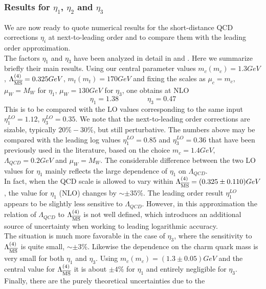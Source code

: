 \subsubsection{Results for $\eta_1$, $\eta_2$ and $\eta_3$}
\label{sec:HeffKKbar:Num:Res}
We are now ready to quote numerical results for the
short-distance QCD corrections $\eta_i$ at next-to-leading order
and to compare them with the leading order approximation.
\\
The factors $\eta_1$ and $\eta_3$ have been analyzed in detail in
\cite{herrlichnierste:93} and \cite{nierste:95}.
Here we summarize briefly their main results.
Using our central parameter values $m_c(m_c)=1.3 GeV$,
$\Lambda_{\overline{\rm MS}}^{(4)}=0.325 GeV$, $m_t(m_t)=170 GeV$ and
fixing the scales as $\mu_c=m_c$, $\mu_W=M_W$ for $\eta_1$,
$\mu_W=130 GeV$ for $\eta_3$, one obtains at NLO
\begin{equation}\label{eta13nlo}
\eta_1=1.38\qquad\qquad \eta_3=0.47
\end{equation}
This is to be compared with the LO values corresponding to the same
input $\eta^{LO}_1=1.12$, $\eta^{LO}_3=0.35$.  We note that the
next-to-leading order corrections are sizable, typically $20\%-30\%$,
but still perturbative.  The numbers above may be compared with the
leading log values $\eta^{LO}_1=0.85$ and $\eta^{LO}_3=0.36$ that have
been previously used in the literature, based on the choice $m_c=1.4
GeV$, $\Lambda_{QCD}=0.2 GeV$ and $\mu_W=M_W$.  The considerable
difference between the two LO values for $\eta_1$ mainly reflects the
large dependence of $\eta_1$ on $\Lambda_{QCD}$.
\\
In fact, when the QCD scale is allowed to vary within
$\Lambda_{\overline{\rm MS}}^{(4)}=(0.325\pm 0.110)GeV$, the
value for $\eta_1$ (NLO) changes by $\sim\pm 35\%$. The leading order
result $\eta^{LO}_1$ appears to be slightly less sensitive to
$\Lambda_{QCD}$. However, in this approximation the relation of
$\Lambda_{QCD}$ to $\Lambda_{\overline{\rm MS}}^{(4)}$ is not well
defined, which introduces an additional source of uncertainty
when working to leading logarithmic accuracy.
\\
The situation is much more favorable in the case of $\eta_3$, where
the sensitivity to $\Lambda_{\overline{\rm MS}}^{(4)}$ is quite small,
$\sim\pm 3\%$.
Likewise the dependence on the charm quark mass is very small for both
$\eta_1$ and $\eta_3$. Using $m_c(m_c)=(1.3\pm 0.05)GeV$ and the
central value for $\Lambda_{\overline{\rm MS}}^{(4)}$ it is about $\pm 4\%$ for $\eta_1$ and
entirely negligible for $\eta_3$.
\\
Finally, there are the purely theoretical uncertainties due to the
